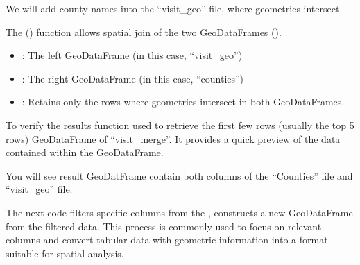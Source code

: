 \documentclass[letterpaper,10pt,english]{sphinxmanual}
\begin{document}
\sphinxAtStartPar
We will add county names into the “visit\_geo” file, where geometries intersect.

\sphinxAtStartPar
The  () function allows spatial join of the two GeoDataFrames ().
\begin{itemize}
\item {} 
\sphinxAtStartPar
{}: The left GeoDataFrame (in this case, “visit\_geo”)

\item {} 
\sphinxAtStartPar
{}: The right GeoDataFrame (in this case, “counties”)

\item {} 
\sphinxAtStartPar
{}: Retains only the rows where geometries intersect in both GeoDataFrames.

\end{itemize}

\begin{sphinxVerbatim}[commandchars=\\\{\}]
  
\end{sphinxVerbatim}

\sphinxAtStartPar
To verify the results  function used to retrieve the first few rows (usually the top 5 rows) GeoDataFrame of “visit\_merge”. It provides a quick preview of the data contained within the GeoDataFrame.

\begin{sphinxVerbatim}[commandchars=\\\{\}]
\end{sphinxVerbatim}

\sphinxAtStartPar
You will see result GeoDatFrame contain both columns of the “Counties” file and “visit\_geo” file.

\sphinxAtStartPar
The next code filters specific columns from the , constructs a new GeoDataFrame from the filtered data.
This process is commonly used to focus on relevant columns and convert tabular data with geometric information into a format suitable for spatial analysis.
\end{document}
